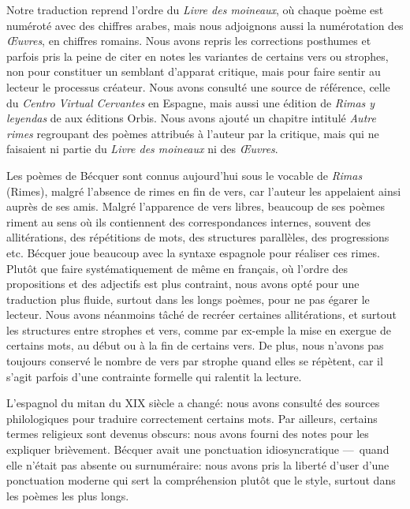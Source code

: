 
Notre traduction reprend l'ordre du \emph{Livre des moineaux}, où
chaque poème est numéroté avec des chiffres arabes, mais nous
adjoignons aussi la numérotation des \emph{Œuvres}, en chiffres
romains. Nous avons repris les corrections posthumes et parfois pris
la peine de citer en notes les variantes de certains vers ou strophes,
non pour constituer un semblant d'apparat critique, mais pour faire
sentir au lecteur le processus créateur. Nous avons consulté une
source de référence, celle du \emph{Centro Virtual Cervantes} en
Espagne, mais aussi une édition de \emph{Rimas y leyendas}
de  aux éditions Orbis. Nous avons ajouté un
chapitre intitulé \emph{Autre rimes} regroupant des poèmes attribués à
l'auteur par la critique, mais qui ne faisaient ni partie
du \emph{Livre des moineaux} ni des
\emph{Œuvres}.

Les poèmes de Bécquer sont connus aujourd'hui sous le vocable de
\emph{Rimas} (Rimes), malgré l'absence de rimes en fin de vers, car
l'auteur les appelaient ainsi auprès de ses amis. Malgré l'apparence
de vers libres, beaucoup de ses poèmes riment au sens où ils
contiennent des correspondances internes, souvent des allitérations,
des répétitions de mots, des structures parallèles, des progressions
etc. Bécquer joue beaucoup avec la syntaxe espagnole pour réaliser ces
rimes. Plutôt que faire systématiquement de même en français, où
l'ordre des propositions et des adjectifs est plus contraint, nous
avons opté pour une traduction plus fluide, surtout dans les longs
poèmes, pour ne pas égarer le lecteur. Nous avons néanmoins tâché de
recréer certaines allitérations, et surtout les structures entre
strophes et vers, comme par ex-emple la mise en exergue de certains
mots, au début ou à la fin de certains vers. De plus, nous n'avons pas
toujours conservé le nombre de vers par strophe quand elles se
répètent, car il s'agit parfois d'une contrainte formelle qui ralentit
la lecture.

L'espagnol du mitan du XIX\ieme{} siècle a changé: nous avons
consulté des sources philologiques pour traduire correctement certains
mots. Par ailleurs, certains termes religieux sont devenus obscurs:
nous avons fourni des notes pour les expliquer brièvement. Bécquer
avait une ponctuation idiosyncratique ---~quand elle n'était pas
absente ou surnuméraire: nous avons pris la liberté d'user d'une
ponctuation moderne qui sert la compréhension plutôt que le style,
surtout dans les poèmes les plus longs.

